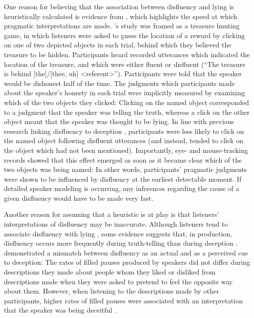 \documentclass[a4paper,man,natbib]{apa6}
\newcommand*{\spex}[1]{``{#1}''} %
\begin{document}
One reason for believing that the association between disfluency and lying is heuristically calculated is evidence from \citet{Loy2016}, which highlights the speed at which pragmatic interpretations are made.
\citeauthor{Loy2016}'s study was framed as a treasure hunting game, in which listeners were asked to guess the location of a reward by clicking on one of two depicted objects in each trial, behind which they believed the treasure to be hidden.
Participants heard recorded utterances which indicated the location of the treasure, and which were either fluent or disfluent (\spex{The treasure is behind [the]/[thee, uh] \textless referent\textgreater}).
Participants were told that the speaker would be dishonest half of the time. 
The judgments which participants made about the speaker's honesty in each trial were implicitly measured by examining which of the two objects they clicked:
Clicking on the named object corresponded to a judgment that the speaker was telling the truth, whereas a click on the other object meant that the speaker was thought to be lying.
In line with previous research linking disfluency to deception \citep{Zuckerman1981},  participants were less likely to click on the named object following disfluent utterances (and instead, tended to click on the object which had not been mentioned).
Importantly, eye- and mouse-tracking records showed that this effect emerged as soon as it became clear which of the two objects was being named:
In other words, participants' pragmatic judgments were shown to be influenced by disfluency at the earliest detectable moment.
If detailed speaker modeling is occurring, any inferences regarding the cause of a given disfluency would have to be made very fast.

Another reason for assuming that a heuristic is at play is that listeners' interpretations of disfluency may be inaccurate.
Although listeners tend to associate disfluency with lying \citep{Loy2016,Zuckerman1981}, some evidence suggests that, in production, disfluency occurs more frequently during truth-telling than during deception \citep{Arciuli2010markers,Arciuli2009lies,Benus2006pauses}.
\citet{DePaulo1982actual} demonstrated a mismatch between disfluency as an actual and as a perceived cue to deception:
The rates of filled pauses produced by speakers did not differ during descriptions they made about people whom they liked or disliked from descriptions made when they were asked to pretend to feel the opposite way about them. 
However, when listening to the descriptions made by other participants, higher rates of filled pauses were associated with an interpretation that the speaker was being deceitful \citep[see also][]{loy2016lying}.
\end{document}

